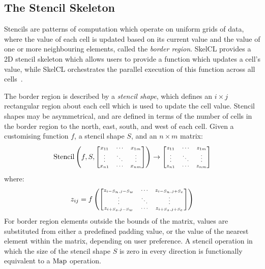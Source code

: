 \documentclass[nonatbib,preprint,9pt]{sigplanconf}
\begin{document}
\subsection{The Stencil Skeleton}

Stencils are patterns of computation which operate on uniform grids of
data, where the value of each cell is updated based on its current
value and the value of one or more neighbouring elements, called the
\emph{border region}. SkelCL provides a 2D stencil skeleton which
allows users to provide a function which updates a cell's value, while
SkelCL orchestrates the parallel execution of this function across all
cells~\cite{Steuwer2014a}.

The border region is described by a \emph{stencil shape}, which
defines an $i \times j$ rectangular region about each cell which is
used to update the cell value. Stencil shapes may be asymmetrical, and
are defined in terms of the number of cells in the border region to
the north, east, south, and west of each cell. Given a customising
function $f$, a stencil shape $S$, and an $n \times m$ matrix:
%
\begin{equation}
\scriptsize
\stencil \left( f, S,
\begin{bmatrix}
  x_{11} & \cdots & x_{1m} \\
  \vdots & \ddots & \vdots \\
  x_{n1} & \cdots & x_{nm}
\end{bmatrix} \right)
\to
\begin{bmatrix}
  z_{11} & \cdots & z_{1m} \\
  \vdots & \ddots & \vdots \\
  z_{n1} & \cdots & z_{nm}
\end{bmatrix}
\end{equation}
%
where:
%
\begin{equation}
\scriptsize
z_{ij} = f \left(
\begin{bmatrix}
  z_{i-S_n,j-S_w} & \cdots & z_{i-S_n,j+S_e} \\
  \vdots & \ddots & \vdots \\
  z_{i+S_s,j-S_w} & \cdots & z_{i+S_s,j+S_e}
\end{bmatrix} \right)
\end{equation}
%
For border region elements outside the bounds of the matrix, values
are substituted from either a predefined padding value, or the value
of the nearest element within the matrix, depending on user preference. A
stencil operation in which the size of the stencil shape $S$ is zero
in every direction is functionally equivalent to a $\operatorname*{Map}$ operation.
\end{document}
